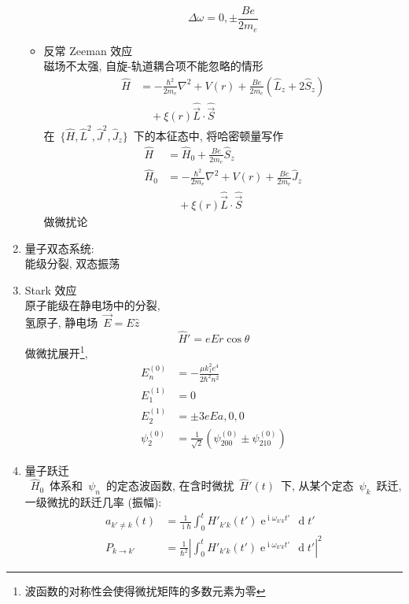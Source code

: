 \documentclass[11pt,a4paper,twocolumn,fleqn]{article}%
\DeclareMathOperator{\diff}{\, d}
\DeclareMathOperator{\mi}{i}
\DeclareMathOperator{\e}{e}%
\renewcommand{\[}{~$}
\renewcommand{\]}{$~}%
\begin{document}
\begin{enumerate}
\begin{itemize}
\begin{equation}
	  	 \Delta \omega = 0,\pm\frac{Be}{2m_e}
	  	\end{equation}
	  	\item 反常 Zeeman 效应\\
	  	磁场不太强, 自旋-轨道耦合项不能忽略的情形
	  	\begin{align}
	  	 \hat H &= -\frac{\hbar^2}{2m_e}\nabla^2 + V(r) + \frac{Be}{2m_e}(\hat L_z + 2\hat S_z) \nonumber \\ &\quad + \xi(r)\hat{\vec L}\cdot\hat{\vec S}
	  	\end{align}
	  	在\[\{\hat H,\hat L^2,\hat J^2,\hat J_z\}\]下的本征态中, 将哈密顿量写作
	  	\begin{align}
	  	 \hat H &= \hat H_0 + \frac{Be}{2m_e}\hat S_z \\
	  	 \hat H_0 &= -\frac{\hbar^2}{2m_e}\nabla^2 + V(r) + \frac{Be}{2m_e}\hat J_z \nonumber \\ &\quad + \xi(r)\hat{\vec L}\cdot\hat{\vec S}
	  	\end{align}
	  	做微扰论
	 \end{itemize}
  \item 量子双态系统:\\
  	能级分裂, 双态振荡
  \item Stark 效应\\
  	原子能级在静电场中的分裂, \\
  	氢原子, 静电场\[\vec E = E\hat z\]
  	\begin{equation}
  	 \hat H' = eEr\cos\theta
  	\end{equation}
  	做微扰展开\footnote{波函数的对称性会使得微扰矩阵的多数元素为零}, 
  	\begin{align}
  	 E_n^{(0)} &= -\frac{\mu k_1^2 e^4}{2\hbar^2n^2} \\
  	 E_1^{(1)} &= 0 \\
  	 E_2^{(1)} &= \pm 3eEa, 0, 0 \\
  	 \psi_2^{(0)} &= \frac{1}{\sqrt 2}\left(\psi_{200}^{(0)} \pm \psi_{210}^{(0)}\right)
  	\end{align}
  \item 量子跃迁\\
  	\[\hat H_0\]体系和\[\psi_n\]的定态波函数, 
  	在含时微扰\[\hat H'(t)\]下, 从某个定态\[\psi_k\]跃迁, 
	一级微扰的跃迁几率 (振幅):
	\begin{align}
	 a_{k'\neq k}(t) &= \frac{1}{\mi\hbar}\int_0^t H'_{k'k}(t')\e^{\mi\omega_{k'k}t'}\diff t' \\
	 P_{k\to k'} &= \frac{1}{\hbar^2}\left|\int_0^t H'_{k'k}(t')\e^{\mi\omega_{k'k}t'}\diff t'\right|^2
	\end{align}

\end{enumerate}
\end{document}
